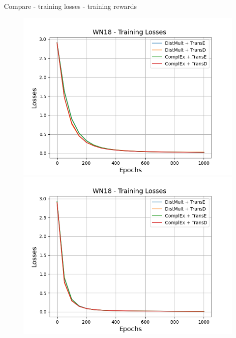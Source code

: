 Compare 
- training losses
- training rewards


\begin{figure}
    \centering
    \begin{minipage}{.5\textwidth}
      \centering
      \includegraphics[width=0.9\linewidth]{figures/results/gan_train/not_pretrained/random/wn18/random_wn18_losses.png}
    \end{minipage}%
    \begin{minipage}{.5\textwidth}
      \centering
      \includegraphics[width=0.9\linewidth]{figures/results/gan_train/not_pretrained/uncertainty/max_distribution/entropy/wn18/uncertainty_wn18_losses.png}
    \end{minipage}
    \begin{minipage}{.5\textwidth}
      \centering

\end{minipage}
\end{figure}
